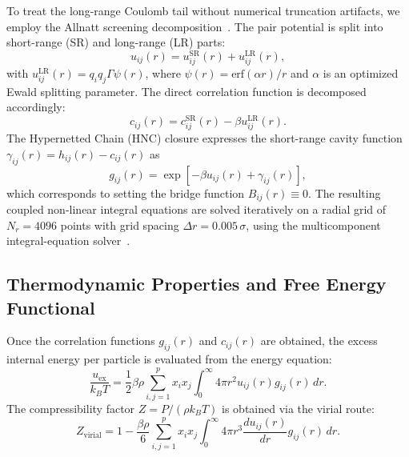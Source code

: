 \documentclass[aps,pre,twocolumn,superscriptaddress,floatfix]{revtex4-2}
\begin{document}
To treat the long-range Coulomb tail without numerical truncation artifacts, we employ the Allnatt screening decomposition~\cite{Allnatt1964,Lomba1994}. The pair potential is split into short-range (SR) and long-range (LR) parts:
\begin{equation}
u_{ij}(r) = u_{ij}^{\text{SR}}(r) + u_{ij}^{\text{LR}}(r),
\end{equation}
with $u_{ij}^{\text{LR}}(r) = q_i q_j \Gamma \psi(r)$, where $\psi(r) = \text{erf}(\alpha r) / r$ and $\alpha$ is an optimized Ewald splitting parameter. The direct correlation function is decomposed accordingly:
\begin{equation}
c_{ij}(r) = c_{ij}^{\text{SR}}(r) - \beta u_{ij}^{\text{LR}}(r).
\end{equation}
The Hypernetted Chain (HNC) closure expresses the short-range cavity function $\gamma_{ij}(r) = h_{ij}(r) - c_{ij}(r)$ as
\begin{equation}
g_{ij}(r) = \exp\left[ -\beta u_{ij}(r) + \gamma_{ij}(r) \right],
\label{eq:hnc_closure}
\end{equation}
which corresponds to setting the bridge function $B_{ij}(r) \equiv 0$. The resulting coupled non-linear integral equations are solved iteratively on a radial grid of $N_r = 4096$ points with grid spacing $\Delta r = 0.005\,\sigma$, using the multicomponent integral-equation solver~\cite{Lomba1996}.

\subsection{Thermodynamic Properties and Free Energy Functional}

Once the correlation functions $g_{ij}(r)$ and $c_{ij}(r)$ are obtained, the excess internal energy per particle is evaluated from the energy equation:
\begin{equation}
\frac{u_{\text{ex}}}{k_B T} = \frac{1}{2} \beta \rho \sum_{i,j=1}^p x_i x_j \int_0^\infty 4\pi r^2 u_{ij}(r) g_{ij}(r) \, dr.
\label{eq:energy_route}
\end{equation}
The compressibility factor $Z = P / (\rho k_B T)$ is obtained via the virial route:
\begin{equation}
Z_{\text{virial}} = 1 - \frac{\beta \rho}{6} \sum_{i,j=1}^p x_i x_j \int_0^\infty 4\pi r^3 \frac{du_{ij}(r)}{dr} g_{ij}(r) \, dr.
\label{eq:virial_route}
\end{equation}
\end{document}

